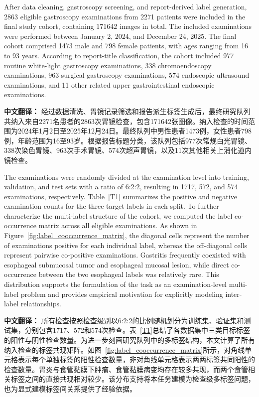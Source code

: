 \documentclass[Afour,sagev,times]{sagej}
\begin{document}
After data cleaning, gastroscopy screening, and report-derived label generation, 2863 eligible gastroscopy examinations from 2271 patients were included in the final study cohort, containing 171642 images in total. The included examinations were performed between January 2, 2024, and December 24, 2025. The final cohort comprised 1473 male and 798 female patients, with ages ranging from 16 to 93 years. According to report-title classification, the cohort included 977 routine white-light gastroscopy examinations, 338 chromoendoscopy examinations, 963 surgical gastroscopy examinations, 574 endoscopic ultrasound examinations, and 11 other related upper gastrointestinal endoscopic examinations.

\textbf{中文翻译：} 经过数据清洗、胃镜记录筛选和报告派生标签生成后，最终研究队列共纳入来自2271名患者的2863次胃镜检查，包含171642张图像。纳入检查的时间范围为2024年1月2日至2025年12月24日。最终队列中男性患者1473例，女性患者798例，年龄范围为16至93岁。根据报告标题分类，该队列包括977次常规白光胃镜、338次染色胃镜、963次手术胃镜、574次超声胃镜，以及11次其他相关上消化道内镜检查。

The examinations were randomly divided at the examination level into training, validation, and test sets with a ratio of 6:2:2, resulting in 1717, 572, and 574 examinations, respectively. Table~\ref{T1} summarizes the positive and negative examination counts for the three target labels in each split. To further characterize the multi-label structure of the cohort, we computed the label co-occurrence matrix across all eligible examinations. As shown in Figure~\ref{fig:label_cooccurrence_matrix}, the diagonal cells represent the number of examinations positive for each individual label, whereas the off-diagonal cells represent pairwise co-positive examinations. Gastritis frequently coexisted with esophageal submucosal tumor and esophageal mucosal lesion, while direct co-occurrence between the two esophageal labels was relatively rare. This distribution supports the formulation of the task as an examination-level multi-label problem and provides empirical motivation for explicitly modeling inter-label relationships.

\textbf{中文翻译：} 所有检查按照检查级别以6:2:2的比例随机划分为训练集、验证集和测试集，分别包含1717、572和574次检查。表~\ref{T1}总结了各数据集中三类目标标签的阳性与阴性检查数量。为进一步刻画研究队列中的多标签结构，本文计算了所有纳入检查的标签共现矩阵。如图~\ref{fig:label_cooccurrence_matrix}所示，对角线单元格表示每个单独标签的阳性检查数量，非对角线单元格表示两两标签共同阳性的检查数量。胃炎与食管黏膜下肿瘤、食管黏膜病变均存在较多共现，而两个食管相关标签之间的直接共现相对较少。该分布支持将本任务建模为检查级多标签问题，也为显式建模标签间关系提供了经验依据。
\end{document}
